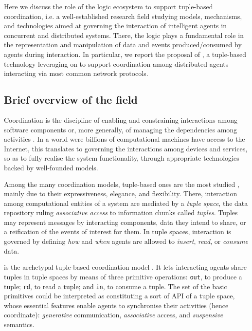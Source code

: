 \documentclass[12pt,a4paper,openright,twoside]{book}
\begin{document}

Here we discuss the role of the \twopkt{} logic ecosystem to support tuple-based coordination, i.e. a well-established research field studying models, mechanisms, and technologies aimed at governing the interaction of intelligent agents in concurrent and distributed systems.
%
There, the logic plays a fundamental role in the representation and manipulation of data and events produced/consumed by agents during interaction.
%
In particular, we report the proposal of \tusow{}, a tuple-based technology leveraging on \twopkt{} to support coordination among distributed agents interacting via most common network protocols.

\subsection{Brief overview of the field}

Coordination is the discipline of enabling and constraining interactions among software components \cite{ciancarini-acmcs28} or, more generally, of managing the dependencies among activities \cite{coordination-csur26}.
%
In a world were billions of computational machines have access to the Internet, this translates to governing the interactions among devices and services, so as to fully realise the system functionality, through appropriate technologies backed by well-founded models.

Among the many coordination models, tuple-based ones are the most studied \cite{techsurvey-coord2018}, mainly due to their expressiveness, elegance, and flexibility.
%
There, interaction among computational entities of a system are mediated by a \emph{tuple space}, the data repository ruling \emph{associative access} to information chunks called \emph{tuples}.
%
Tuples may represent messages by interacting components, data they intend to share, or a reification of the events of interest for them.
%
In tuple spaces, interaction is governed by defining \emph{how} and \emph{when} agents are allowed to \emph{insert}, \emph{read}, or \emph{consume} data.

\linda{} is the archetypal tuple-based coordination model \cite{linda-toplas7}.
%
It lets interacting agents share tuples in tuple spaces by means of three primitive operations: \texttt{out}, to produce a tuple; \texttt{rd}, to read a tuple; and \texttt{in}, to consume a tuple.
%
The set of the basic \linda{} primitives could be interpreted as constituting a sort of API of a tuple space, whose essential features enable agents to synchronise their activities (hence coordinate): \emph{generative} communication, \emph{associative} access, and \emph{suspensive} semantics.
\end{document}
